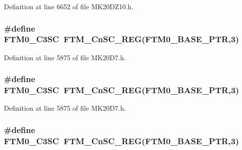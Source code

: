 Definition at line 6652 of file M\+K20\+D\+Z10.\+h.

\subsubsection[{\texorpdfstring{F\+T\+M0\+\_\+\+C3\+SC}{FTM0_C3SC}}]{\setlength{\rightskip}{0pt plus 5cm}\#define F\+T\+M0\+\_\+\+C3\+SC~{\bf F\+T\+M\+\_\+\+Cn\+S\+C\+\_\+\+R\+EG}({\bf F\+T\+M0\+\_\+\+B\+A\+S\+E\+\_\+\+P\+TR},3)}\hypertarget{group___f_t_m___register___accessor___macros_gafab69f9cb0c1d9c1856a376a9cc3a8c4}{}\label{group___f_t_m___register___accessor___macros_gafab69f9cb0c1d9c1856a376a9cc3a8c4}


Definition at line 5875 of file M\+K20\+D7.\+h.

\subsubsection[{\texorpdfstring{F\+T\+M0\+\_\+\+C3\+SC}{FTM0_C3SC}}]{\setlength{\rightskip}{0pt plus 5cm}\#define F\+T\+M0\+\_\+\+C3\+SC~{\bf F\+T\+M\+\_\+\+Cn\+S\+C\+\_\+\+R\+EG}({\bf F\+T\+M0\+\_\+\+B\+A\+S\+E\+\_\+\+P\+TR},3)}\hypertarget{group___f_t_m___register___accessor___macros_gafab69f9cb0c1d9c1856a376a9cc3a8c4}{}\label{group___f_t_m___register___accessor___macros_gafab69f9cb0c1d9c1856a376a9cc3a8c4}


Definition at line 5875 of file M\+K20\+D7.\+h.

\subsubsection[{\texorpdfstring{F\+T\+M0\+\_\+\+C3\+SC}{FTM0_C3SC}}]{\setlength{\rightskip}{0pt plus 5cm}\#define F\+T\+M0\+\_\+\+C3\+SC~{\bf F\+T\+M\+\_\+\+Cn\+S\+C\+\_\+\+R\+EG}({\bf F\+T\+M0\+\_\+\+B\+A\+S\+E\+\_\+\+P\+TR},3)}\hypertarget{group___f_t_m___register___accessor___macros_gafab69f9cb0c1d9c1856a376a9cc3a8c4}{}\label{group___f_t_m___register___accessor___macros_gafab69f9cb0c1d9c1856a376a9cc3a8c4}


